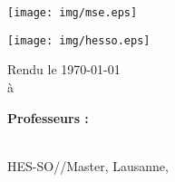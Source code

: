 \begin{titlepage}
    \begin{flushleft}

        \begin{minipage}[c][1.5cm][t]{0.4\textwidth}
            \begin{flushleft}
                \vspace{0.1cm}
                \texttt{[image: img/mse.eps]}
            \end{flushleft}
        \end{minipage}
        \hfill
        \begin{minipage}[c][1.5cm][t]{0.4\textwidth}
            \begin{flushright}
                \texttt{[image: img/hesso.eps]}
            \end{flushright}
        \end{minipage}

        \makeatletter

        \vspace{3cm}

        {\huge \bfseries \@course \par}
        {\Large \@title \par}

        \vspace{1cm}

        \mAuthors

        \vspace{0.6cm}
        
        Rendu le \today \\
        à \@location

        \vspace*{\fill}

        \begin{minipage}[t]{0.49\textwidth}
            \begin{flushleft}
                \textbf{Professeurs :} \\
                \mSupervisors\\
            \end{flushleft}
         \end{minipage}

        \vspace{2cm}
        \makeatother

        \end{flushleft}
        \begin{center}
             {HES-SO\thinspace//\thinspace Master, Lausanne, \the\year}\\
        \end{center}
    \restoregeometry
\end{titlepage}